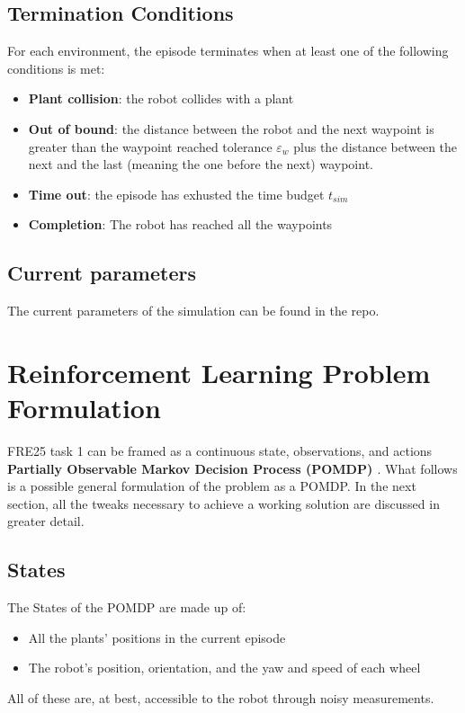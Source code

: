 \documentclass[11pt,a4paper,twocolumn]{article}
\begin{document}
\subsection{Termination Conditions}
For each environment, the episode terminates when at least one of the following conditions is met:
\begin{itemize}
    \item \textbf{Plant collision}: the robot collides with a plant
    \item \textbf{Out of bound}: the distance between the robot and the next waypoint is greater than the waypoint reached tolerance $\varepsilon_w$ plus the distance between the next and the last (meaning the one before the next) waypoint.
    \item \textbf{Time out}: the episode has exhusted the time budget $t_{sim}$
    \item \textbf{Completion}: The robot has reached all the waypoints
\end{itemize}

\subsection{Current parameters}
The current parameters of the simulation can be found in the repo.

\section{Reinforcement Learning Problem Formulation}
FRE25 task 1 can be framed as a continuous state, observations, and actions \textbf{Partially Observable Markov Decision Process (POMDP) \cite{POMDPS}}. What follows is a possible general formulation of the problem as a POMDP. In the next section, all the tweaks necessary to achieve a working solution are discussed in greater detail. 

\subsection{States}
The States of the POMDP are made up of:
\begin{itemize}
    \item All the plants' positions in the current episode
    \item The robot's position, orientation, and the yaw and speed of each wheel
\end{itemize}

All of these are, at best, accessible to the robot through noisy measurements.
\end{document}
